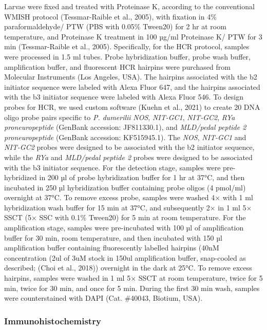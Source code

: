 \documentclass[
  11pt,
  letterpaper,
  DIV=11,
  numbers=noendperiod]{scrartcl}
\begin{document}
Larvae were fixed and treated with Proteinase K, according to the
conventional WMISH protocol (Tessmar-Raible et al., 2005), with fixation
in 4\% paraformaldehyde/ PTW (PBS with 0.05\% Tween20) for 2 hr at room
temperature, and Proteinase K treatment in 100 µg/ml Proteinase K/ PTW
for 3 min (Tessmar-Raible et al., 2005). Specifically, for the HCR
protocol, samples were processed in 1.5 ml tubes. Probe hybridization
buffer, probe wash buffer, amplification buffer, and fluorescent HCR
hairpins were purchased from Molecular Instruments (Los Angeles, USA).
The hairpins associated with the b2 initiator sequence were labeled with
Alexa Fluor 647, and the hairpins associated with the b3 initiator
sequence were labeled with Alexa Fluor 546. To design probes for HCR, we
used custom software (Kuehn et al., 2021) to create 20 DNA oligo probe
pairs specific to \emph{P. dumerilii} \emph{NOS}, \emph{NIT-GC1},
\emph{NIT-GC2}, \emph{RYa proneuropeptide} (GenBank accession:
JF811330.1), and \emph{MLD/pedal peptide 2 proneuropeptide} (GenBank
accession: KF515945.1). The \emph{NOS}, \emph{NIT-GC1} and
\emph{NIT-GC2} probes were designed to be associated with the b2
initiator sequence, while the \emph{RYa} and \emph{MLD/pedal peptide 2}
probes were designed to be associated with the b3 initiator sequence.
For the detection stage, samples were pre-hybridized in 200 µl of probe
hybridization buffer for 1 hr at 37°C, and then incubated in 250 µl
hybridization buffer containing probe oligos (4 pmol/ml) overnight at
37°C. To remove excess probe, samples were washed 4× with 1 ml
hybridization wash buffer for 15 min at 37°C, and subsequently 2× in 1
ml 5× SSCT (5× SSC with 0.1\% Tween20) for 5 min at room temperature.
For the amplification stage, samples were pre-incubated with 100 µl of
amplification buffer for 30 min, room temperature, and then incubated
with 150 µl amplification buffer containing fluorescently labelled
hairpins (40nM concentration (2ul of 3uM stock in 150ul amplification
buffer, snap-cooled as described; (Choi et al., 2018)) overnight in the
dark at 25°C. To remove excess hairpins, samples were washed in 1 ml 5×
SSCT at room temperature, twice for 5 min, twice for 30 min, and once
for 5 min. During the first 30 min wash, samples were counterstained
with DAPI (Cat. \#40043, Biotium, USA).

\subsubsection{Immunohistochemistry}\label{immunohistochemistry}
\end{document}
